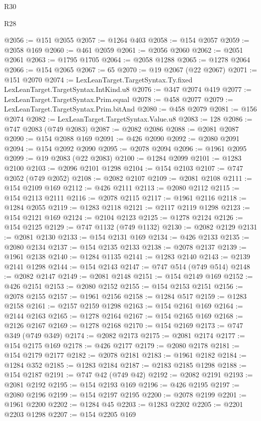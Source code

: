 \begin{lexlean}{R30}
\begin{lexlean}{R28}
\begin{coremodule}
{{{{{{{{{{{{{{{{{{{{{{{{{{{{{{{{{{{{{{{{{{{{{{{{{{{{{{{{{{{{{{{{{{{{{{{{{{{{{{{{{{{{{{{{{{{{{{{{{{{{{{{{{{{{{{{{{{{{{{{{{{{{{{{{{{{{{{{{{{{{{{{@2056 := @151 @2055
@2057 := @1264 @403
@2058 := @154 @2057
@2059 := @2058 @169
@2060 := @461 @2059
@2061 := @2056 @2060
@2062 := @2051 @2061
@2063 := @1795 @1705
@2064 := @2058 @1288
@2065 := @1278 @2064
@2066 := @154 @2065
@2067 := 65
@2070 := @19 @2067 (@22 @2067)
@2071 := @151 @2070
@2074 := LexLeanTarget.TargetSyntax.Ty.fixed LexLeanTarget.TargetSyntax.IntKind.u8
@2076 := @347 @2074 @419
@2077 := LexLeanTarget.TargetSyntax.Prim.equal
@2078 := @458 @2077
@2079 := LexLeanTarget.TargetSyntax.Prim.bitAnd
@2080 := @458 @2079
@2081 := @156 @2074
@2082 := LexLeanTarget.TargetSyntax.Value.u8
@2083 := 128
@2086 := @747 @2083 (@749 @2083)
@2087 := @2082 @2086
@2088 := @2081 @2087
@2090 := @154 @2088 @169
@2091 := @426 @2090
@2092 := @2080 @2091
@2094 := @154 @2092 @2090
@2095 := @2078 @2094
@2096 := @1961 @2095
@2099 := @19 @2083 (@22 @2083)
@2100 := @1284 @2099
@2101 := @1283 @2100
@2103 := @2096 @2101 @1298
@2104 := @154 @2103
@2107 := @747 @2052 (@749 @2052)
@2108 := @2082 @2107
@2109 := @2081 @2108
@2111 := @154 @2109 @169
@2112 := @426 @2111
@2113 := @2080 @2112
@2115 := @154 @2113 @2111
@2116 := @2078 @2115
@2117 := @1961 @2116
@2118 := @1284 @2055
@2119 := @1283 @2118
@2121 := @2117 @2119 @1298
@2123 := @154 @2121 @169
@2124 := @2104 @2123
@2125 := @1278 @2124
@2126 := @154 @2125
@2129 := @747 @1132 (@749 @1132)
@2130 := @2082 @2129
@2131 := @2081 @2130
@2133 := @154 @2131 @169
@2134 := @426 @2133
@2135 := @2080 @2134
@2137 := @154 @2135 @2133
@2138 := @2078 @2137
@2139 := @1961 @2138
@2140 := @1284 @1135
@2141 := @1283 @2140
@2143 := @2139 @2141 @1298
@2144 := @154 @2143
@2147 := @747 @514 (@749 @514)
@2148 := @2082 @2147
@2149 := @2081 @2148
@2151 := @154 @2149 @169
@2152 := @426 @2151
@2153 := @2080 @2152
@2155 := @154 @2153 @2151
@2156 := @2078 @2155
@2157 := @1961 @2156
@2158 := @1284 @517
@2159 := @1283 @2158
@2161 := @2157 @2159 @1298
@2163 := @154 @2161 @169
@2164 := @2144 @2163
@2165 := @1278 @2164
@2167 := @154 @2165 @169
@2168 := @2126 @2167
@2169 := @1278 @2168
@2170 := @154 @2169
@2173 := @747 @349 (@749 @349)
@2174 := @2082 @2173
@2175 := @2081 @2174
@2177 := @154 @2175 @169
@2178 := @426 @2177
@2179 := @2080 @2178
@2181 := @154 @2179 @2177
@2182 := @2078 @2181
@2183 := @1961 @2182
@2184 := @1284 @352
@2185 := @1283 @2184
@2187 := @2183 @2185 @1298
@2188 := @154 @2187
@2191 := @747 @42 (@749 @42)
@2192 := @2082 @2191
@2193 := @2081 @2192
@2195 := @154 @2193 @169
@2196 := @426 @2195
@2197 := @2080 @2196
@2199 := @154 @2197 @2195
@2200 := @2078 @2199
@2201 := @1961 @2200
@2202 := @1284 @45
@2203 := @1283 @2202
@2205 := @2201 @2203 @1298
@2207 := @154 @2205 @169
}}}}}}}}}}}}}}}}}}}}}}}}}}}}}}}}}}}}}}}}}}}}}}}}}}}}}}}}}}}}}}}}}}}}}}}}}}}}}}}}}}}}}}}}}}}}}}}}}}}}}}}}}}}}}}}}}}}}}}}}}}}}}}}}}}}}}}}}}}}}}}}
\end{coremodule}
\end{lexlean}
\end{lexlean}
